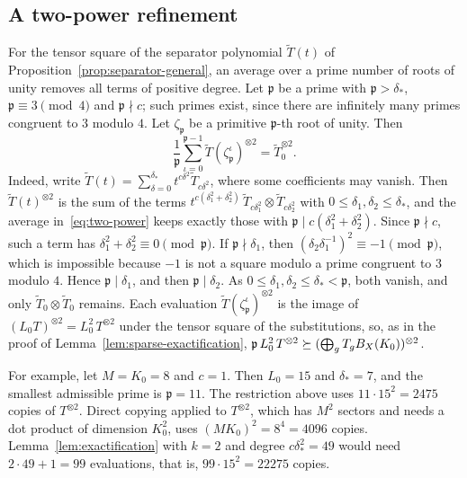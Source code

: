 \subsection{A two-power refinement}

For the tensor square of the separator polynomial
\(\widetilde T(t)\) of Proposition~\ref{prop:separator-general}, an
average over a prime number of roots of unity removes all terms of
positive degree. Let \(\mathfrak p\) be a prime with
\(\mathfrak p>\delta_*\), \(\mathfrak p\equiv3\pmod 4\) and
\(\mathfrak p\nmid c\); such primes exist, since there are infinitely many
primes congruent to \(3\) modulo \(4\). Let \(\zeta_{\mathfrak p}\) be a
primitive \(\mathfrak p\)-th root of unity. Then
\begin{equation}\label{eq:two-power}
 \frac1{\mathfrak p}\sum_{\iota=0}^{\mathfrak p-1}
 \widetilde T(\zeta_{\mathfrak p}^\iota)^{\otimes2}=\widetilde T_0^{\otimes2}.
\end{equation}
Indeed, write
\(\widetilde T(t)=\sum_{\delta=0}^{\delta_*}t^{c\delta^2}\widetilde T_{c\delta^2}\),
where some coefficients may vanish. Then \(\widetilde T(t)^{\otimes2}\) is
the sum of the terms
\(t^{c(\delta_1^2+\delta_2^2)}\,\widetilde T_{c\delta_1^2}\otimes
\widetilde T_{c\delta_2^2}\) with \(0\le\delta_1,\delta_2\le\delta_*\),
and the average in~\eqref{eq:two-power} keeps exactly those with
\(\mathfrak p\mid c(\delta_1^2+\delta_2^2)\). Since \(\mathfrak p\nmid c\),
such a term has \(\delta_1^2+\delta_2^2\equiv0\pmod{\mathfrak p}\). If
\(\mathfrak p\nmid\delta_1\), then \((\delta_2\delta_1^{-1})^2\equiv-1
\pmod{\mathfrak p}\), which is impossible because \(-1\) is not a square
modulo a prime congruent to \(3\) modulo \(4\). Hence
\(\mathfrak p\mid\delta_1\), and then \(\mathfrak p\mid\delta_2\). As
\(0\le\delta_1,\delta_2\le\delta_*<\mathfrak p\), both vanish, and only
\(\widetilde T_0\otimes\widetilde T_0\) remains. Each evaluation
\(\widetilde T(\zeta_{\mathfrak p}^\iota)^{\otimes2}\) is the image of
\((L_0T)^{\otimes2}=L_0^2\,T^{\otimes2}\) under the tensor square of the
substitutions, so, as in the proof of
Lemma~\ref{lem:sparse-exactification},
\(\mathfrak p\,L_0^2\,T^{\otimes2}\succeq
(\bigoplus_gT_gB_X(K_0))^{\otimes2}\).

For example, let \(M=K_0=8\) and \(c=1\). Then \(L_0=15\) and
\(\delta_*=7\), and the smallest admissible prime is \(\mathfrak p=11\).
The restriction above uses \(11\cdot15^2=2475\) copies of \(T^{\otimes2}\).
Direct copying applied to \(T^{\otimes2}\), which has \(M^2\) sectors and
needs a dot product of dimension \(K_0^2\), uses \((MK_0)^2=8^4=4096\)
copies. Lemma~\ref{lem:exactification} with \(k=2\) and degree
\(c\delta_*^2=49\) would need \(2\cdot49+1=99\) evaluations, that is,
\(99\cdot15^2=22275\) copies.
